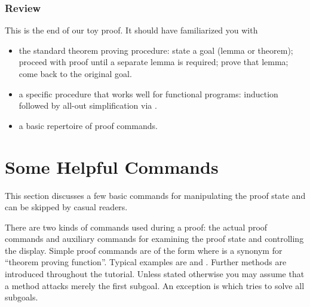\subsubsection*{Review}

This is the end of our toy proof. It should have familiarized you with
\begin{itemize}
\item the standard theorem proving procedure:
state a goal (lemma or theorem); proceed with proof until a separate lemma is
required; prove that lemma; come back to the original goal.
\item a specific procedure that works well for functional programs:
induction followed by all-out simplification via .
\item a basic repertoire of proof commands.
\end{itemize}


\section{Some Helpful Commands}
\label{sec:commands-and-hints}

This section discusses a few basic commands for manipulating the proof state
and can be skipped by casual readers.

There are two kinds of commands used during a proof: the actual proof
commands and auxiliary commands for examining the proof state and controlling
the display. Simple proof commands are of the form
 where  is a
synonym for ``theorem proving function''. Typical examples are
 and . Further methods are introduced throughout
the tutorial.  Unless stated otherwise you may assume that a method attacks
merely the first subgoal. An exception is  which tries to solve all
subgoals.

